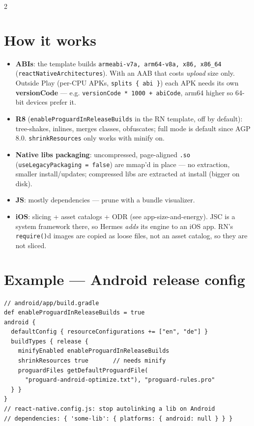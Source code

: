 \documentclass[8pt]{extarticle}
\begin{document}
\begin{multicols}{2}
\raggedright

\section{How it works}
\begin{itemize}\raggedright
  \item \textbf{ABIs}: the template builds \texttt{armeabi-v7a, arm64-v8a, x86, x86\_64}
        (\texttt{reactNativeArchitectures}). With an AAB that costs \emph{upload} size only.
        Outside Play (per-CPU APKs, \texttt{splits \{ abi \}}) each APK needs its own
        \textbf{versionCode} — e.g. \texttt{versionCode * 1000 + abiCode}, arm64 higher so
        64-bit devices prefer it.
  \item \textbf{R8} (\texttt{enableProguardInReleaseBuilds} in the RN template, off by
        default): tree-shakes, inlines, merges classes, obfuscates; full mode is default
        since AGP 8.0. \texttt{shrinkResources} only works with minify on.
  \item \textbf{Native libs packaging}: uncompressed, page-aligned \texttt{.so}
        (\texttt{useLegacyPackaging = false}) are mmap'd in place — no extraction, smaller
        install/updates; compressed libs are extracted at install (bigger on disk).
  \item \textbf{JS}: mostly dependencies — prune with a bundle visualizer.
  \item \textbf{iOS}: slicing + asset catalogs + ODR (see app-size-and-energy). JSC is a
        system framework there, so Hermes \emph{adds} its engine to an iOS app. RN's
        \texttt{require()}d images are copied as loose files, not an asset catalog, so they
        are not sliced\unverified.
\end{itemize}

\section{Example — Android release config}
\begin{lstlisting}[language=GrSheet]
// android/app/build.gradle
def enableProguardInReleaseBuilds = true
android {
  defaultConfig { resourceConfigurations += ["en", "de"] }
  buildTypes { release {
    minifyEnabled enableProguardInReleaseBuilds
    shrinkResources true       // needs minify
    proguardFiles getDefaultProguardFile(
      "proguard-android-optimize.txt"), "proguard-rules.pro"
  } }
}
// react-native.config.js: stop autolinking a lib on Android
// dependencies: { 'some-lib': { platforms: { android: null } } }
\end{lstlisting}


\end{multicols}
\end{document}
